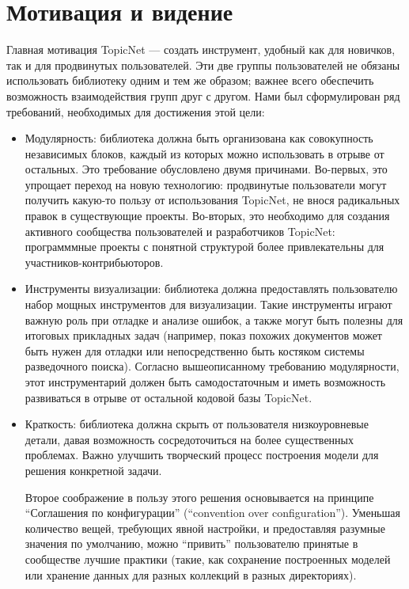 \section{Мотивация и видение}

Главная мотивация TopicNet --- создать инструмент, удобный как для новичков, так и для продвинутых пользователей. Эти две группы пользователей не обязаны использовать библиотеку одним и тем же образом; важнее всего обеспечить возможность взаимодействия групп друг с другом. Нами был сформулирован ряд требований, необходимых для достижения этой цели:

\begin{itemize}
\item{Модулярность: библиотека должна быть организована как совокупность независимых блоков, каждый из которых можно использовать в отрыве от остальных. Это требование обусловлено двумя причинами. Во-первых, это упрощает переход на новую технологию: продвинутые пользователи могут получить какую-то пользу от использования TopicNet, не внося радикальных правок в существующие проекты. Во-вторых, это необходимо для создания активного сообщества пользователей и разработчиков TopicNet: программмные проекты с понятной структурой более привлекательны для участников-контрибьюторов.}

\item{Инструменты визуализации: библиотека должна предоставлять пользователю набор мощных инструментов для визуализации. 
Такие инструменты играют важную роль при отладке и анализе ошибок, а также могут быть полезны для итоговых прикладных задач (например, показ похожих документов может быть нужен для отладки или непосредственно быть костяком системы разведочного поиска). 
Согласно вышеописанному требованию модулярности, этот инструментарий должен быть самодостаточным и иметь возможность развиваться в отрыве от остальной кодовой базы TopicNet.}

\item{Краткость: библиотека должна скрыть от пользователя низкоуровневые детали, давая возможность сосредоточиться на более существенных проблемах. Важно улучшить творческий процесс построения модели для решения конкретной задачи. 

Второе соображение в пользу этого решения основывается на принципе ``Соглашения по конфигурации'' (``convention over configuration''). Уменьшая количество вещей, требующих явной настройки, и предоставляя разумные значения по умолчанию, можно ``привить'' пользователю принятые в сообществе лучшие практики (такие, как сохранение построенных моделей или хранение данных для разных коллекций в разных директориях).

}
\end{itemize}
